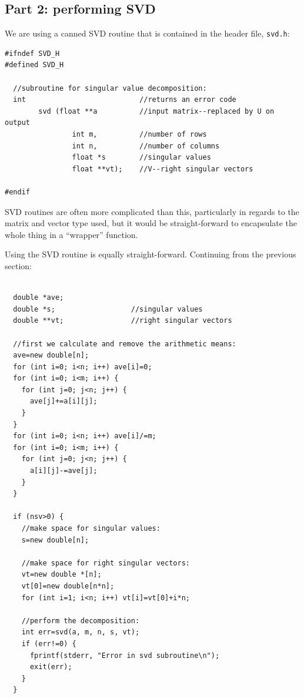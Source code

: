 \documentclass{article}
\begin{document}
\subsection{Part 2: performing SVD}

We are using a canned SVD routine that is contained in the header file,
\verb/svd.h/:

\begin{verbatim}
#ifndef SVD_H
#defined SVD_H

  //subroutine for singular value decomposition:
  int                           //returns an error code
        svd (float **a          //input matrix--replaced by U on output
                int m,          //number of rows
                int n,          //number of columns
                float *s        //singular values
                float **vt);    //V--right singular vectors

#endif
\end{verbatim}

SVD routines are often more complicated than this, particularly in regards
to the matrix and vector type used, but it would be 
straight-forward to encapsulate the whole thing in a ``wrapper'' function.

Using the SVD routine is equally straight-forward.
Continuing from the previous section:

\begin{verbatim}

  double *ave;
  double *s;                  //singular values
  double **vt;                //right singular vectors

  //first we calculate and remove the arithmetic means:
  ave=new double[n];
  for (int i=0; i<n; i++) ave[i]=0;
  for (int i=0; i<m; i++) {
    for (int j=0; j<n; j++) {
      ave[j]+=a[i][j];
    }
  }
  for (int i=0; i<n; i++) ave[i]/=m;
  for (int i=0; i<m; i++) {
    for (int j=0; j<n; j++) {
      a[i][j]-=ave[j];
    }
  }

  if (nsv>0) {
    //make space for singular values:
    s=new double[n];

    //make space for right singular vectors:
    vt=new double *[n];
    vt[0]=new double[n*n];
    for (int i=1; i<n; i++) vt[i]=vt[0]+i*n;

    //perform the decomposition:
    int err=svd(a, m, n, s, vt);
    if (err!=0) {
      fprintf(stderr, "Error in svd subroutine\n");
      exit(err);
    }
  }

\end{verbatim}
\end{document}
